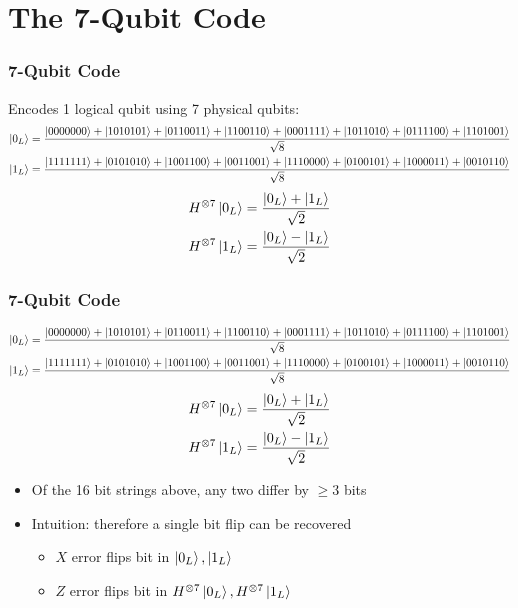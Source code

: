 \documentclass{beamer}
\begin{document}
\section{The 7-Qubit Code}
\begin{frame}
  \frametitle{7-Qubit Code}
  Encodes 1 logical qubit using 7 physical qubits:
  {\tiny
    \begin{align*}
      \ket{0_L} &= \frac{\ket{0000000}+\ket{1010101}+\ket{0110011}+\ket{1100110}+\ket{0001111}+\ket{1011010}+\ket{0111100}+\ket{1101001}}{\sqrt{8}} \\
      \ket{1_L} &= \frac{\ket{1111111}+\ket{0101010}+\ket{1001100}+\ket{0011001}+\ket{1110000}+\ket{0100101}+\ket{1000011}+\ket{0010110}}{\sqrt{8}}
    \end{align*}
    \begin{align*}
      H^{\otimes 7}\ket{0_L} &= \frac{\ket{0_L}+\ket{1_L}}{\sqrt{2}} \\
      H^{\otimes 7}\ket{1_L} &= \frac{\ket{0_L}-\ket{1_L}}{\sqrt{2}}
    \end{align*}
  }
\end{frame}

\begin{frame}
  \frametitle{7-Qubit Code}
  \vspace{-1cm}
  {\tiny
    \begin{align*}
      \ket{0_L} &= \frac{\ket{0000000}+\ket{1010101}+\ket{0110011}+\ket{1100110}+\ket{0001111}+\ket{1011010}+\ket{0111100}+\ket{1101001}}{\sqrt{8}} \\
      \ket{1_L} &= \frac{\ket{1111111}+\ket{0101010}+\ket{1001100}+\ket{0011001}+\ket{1110000}+\ket{0100101}+\ket{1000011}+\ket{0010110}}{\sqrt{8}}
    \end{align*}
    \begin{align*}
      H^{\otimes 7}\ket{0_L} &= \frac{\ket{0_L}+\ket{1_L}}{\sqrt{2}} \\
      H^{\otimes 7}\ket{1_L} &= \frac{\ket{0_L}-\ket{1_L}}{\sqrt{2}}
    \end{align*}
  }
  \begin{itemize}
  \item Of the 16 bit strings above, any two differ by $\geq 3$ bits
  \item Intuition: therefore a single bit flip can be recovered
    \begin{itemize}
    \item $X$ error flips bit in $\ket{0_L},\ket{1_L}$
    \item $Z$ error flips bit in $H^{\otimes 7}\ket{0_L},H^{\otimes 7}\ket{1_L}$
    \end{itemize}
  \end{itemize}
\end{frame}
\end{document}
